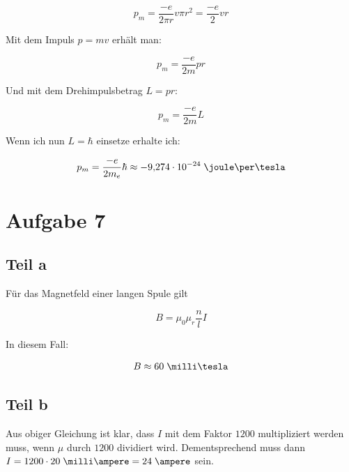 \documentclass[a4paper,german,12pt,smallheadings]{scrartcl}
\begin{document}
\begin{equation}
  p_m = \frac{-e}{2 \pi r} v \pi r^2 = \frac{-e}{2} v r
\end{equation}

Mit dem Impuls $p = mv$ erhält man:

\begin{equation}
  p_m = \frac{-e}{2m} p r
\end{equation}

Und mit dem Drehimpulsbetrag $L = pr$:

\begin{equation}
  p_m = \frac{-e}{2m} L
\end{equation}

Wenn ich nun $L = \hbar$ einsetze erhalte ich:

\begin{equation}
  p_m = \frac{-e}{2m_e} \hbar \approx -9{,}274 \cdot 10^{-24} \;\joule\per\tesla
\end{equation}

\section*{Aufgabe 7}
\subsection*{Teil a}
Für das Magnetfeld einer langen Spule gilt

\begin{equation}
  B = \mu_0 \mu_r \frac{n}{l} I
\end{equation}

In diesem Fall:

\begin{align*}
  B \approx 60 \;\milli\tesla
\end{align*}

\subsection*{Teil b}
Aus obiger Gleichung ist klar, dass $I$ mit dem Faktor $1200$ multipliziert
werden muss, wenn $\mu$ durch $1200$ dividiert wird. Dementsprechend muss dann
$I = 1200 \cdot 20\;\milli\ampere = 24\;\ampere$ sein.
\end{document}
